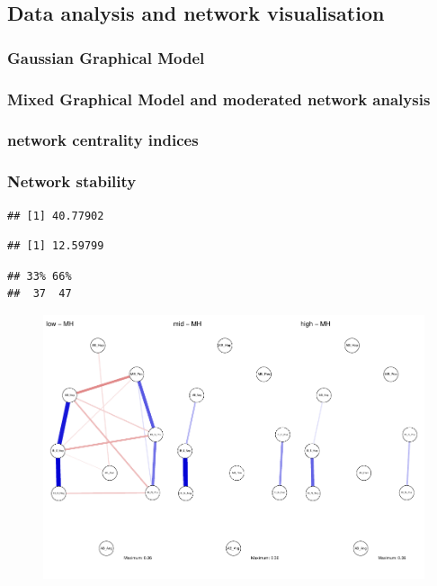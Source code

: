 \documentclass[man,floatsintext]{apa6}
\begin{document}
\subsection{Data analysis and network
visualisation}\label{data-analysis-and-network-visualisation}

\subsubsection{Gaussian Graphical Model}\label{gaussian-graphical-model}

\subsubsection{Mixed Graphical Model and moderated network
analysis}\label{mixed-graphical-model-and-moderated-network-analysis}

\subsubsection{network centrality
indices}\label{network-centrality-indices}

\subsubsection{Network stability}\label{network-stability}

\begin{verbatim}
## [1] 40.77902
\end{verbatim}

\begin{verbatim}
## [1] 12.59799
\end{verbatim}

\begin{verbatim}
## 33% 66% 
##  37  47
\end{verbatim}

\begin{figure}
\centering
\includegraphics{script_files/figure-latex/glasso networks-1.pdf}
\caption{}
\end{figure}
\end{document}
